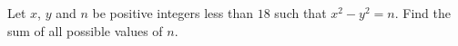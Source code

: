 Let $x$, $y$ and $n$ be positive integers less than $18$ such that $x^2-y^2=n$. Find the sum of all possible values of $n$.
